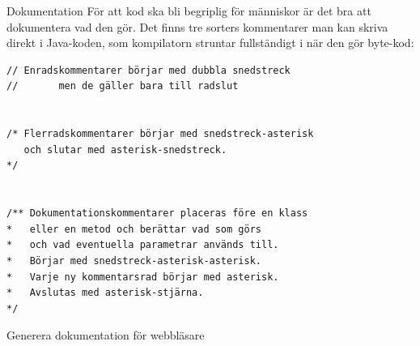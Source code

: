 \documentclass{lecturenotes}
\begin{document}
\begin{Slide}{Dokumentation}\footnotesize
För att kod ska bli begriplig för människor är det bra att dokumentera vad den gör. Det finns tre sorters kommentarer man kan skriva direkt i Java-koden, som kompilatorn struntar fullständigt i när den gör byte-kod:
\begin{lstlisting}
// Enradskommentarer börjar med dubbla snedstreck
//       men de gäller bara till radslut


/* Flerradskommentarer börjar med snedstreck-asterisk
   och slutar med asterisk-snedstreck.
*/ 


/** Dokumentationskommentarer placeras före en klass
*   eller en metod och berättar vad som görs
*   och vad eventuella parametrar används till.
*   Börjar med snedstreck-asterisk-asterisk.
*   Varje ny kommentarsrad börjar med asterisk.
*   Avslutas med asterisk-stjärna.
*/
\end{lstlisting}
\end{Slide}

\begin{Slide}{Generera dokumentation för webbläsare}
\end{Slide}

\end{document}
